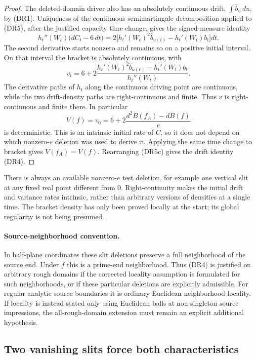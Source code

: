 \documentclass[11pt]{article}
\theoremstyle{definition}\newtheorem{definition}[theorem]{Definition}
\theoremstyle{remark}\newtheorem{remark}[theorem]{Remark}
\begin{document}
\begin{proof}
The deleted-domain driver also has an absolutely continuous drift,
$\int\widehat b_u\,du$, by (DR1).  Uniqueness of the continuous
semimartingale decomposition applied to (DR5), after the justified capacity
time change, gives the signed-measure identity
\[
 h_t''(W_t)\bigl(dC_t-6\,dt\bigr)
   =2\bigl[h_t'(W_t)^2\widehat b_{u(t)}
                      -h_t'(W_t)b_t\bigr]dt.
 \tag{DR5a}
\]
The second derivative starts nonzero and remains so on a positive initial
interval.  On that interval the bracket is absolutely continuous, with
\[
 v_t=6+2\frac{h_t'(W_t)^2\widehat b_{u(t)}
                         -h_t'(W_t)b_t}{h_t''(W_t)}.
 \tag{DR5b}
\]
The derivative paths of $h_t$ along the continuous driving point are
continuous, while the two drift-density paths are right-continuous and
finite.  Thus $v$ is right-continuous and finite there.  In particular
\[
 V(f)=v_0
   =6+2\frac{d^2 B(f_A)-d B(f)}e
 \tag{DR5c}
\]
is deterministic.  This is an intrinsic initial rate of $C$, so it does
not depend on which nonzero-$e$ deletion was used to derive it.
Applying the same time change to bracket gives
$V(f_A)=V(f)$.  Rearranging (DR5c) gives the drift identity (DR4).
\end{proof}

There is always an available nonzero-$e$ test deletion, for example one
vertical slit at any fixed real point different from $0$.  Right-continuity
makes the initial drift and variance rates intrinsic, rather than arbitrary
versions of densities at a single time.  The bracket density has only been
proved locally at the start; its global regularity is not being presumed.

\paragraph{Source-neighborhood convention.}
In half-plane coordinates these slit deletions preserve a full neighborhood
of the source end.  Under $f$ this is a prime-end neighborhood.  Thus (DR4)
is justified on arbitrary rough domains if the corrected locality assumption
is formulated for such neighborhoods, or if these particular deletions are
explicitly admissible.  For regular analytic source boundaries it is ordinary
Euclidean neighborhood locality.  If locality is instead stated only using
Euclidean balls at non-singleton source impressions, the all-rough-domain
extension must remain an explicit additional hypothesis.

\subsection{Two vanishing slits force both characteristics}
\end{document}
